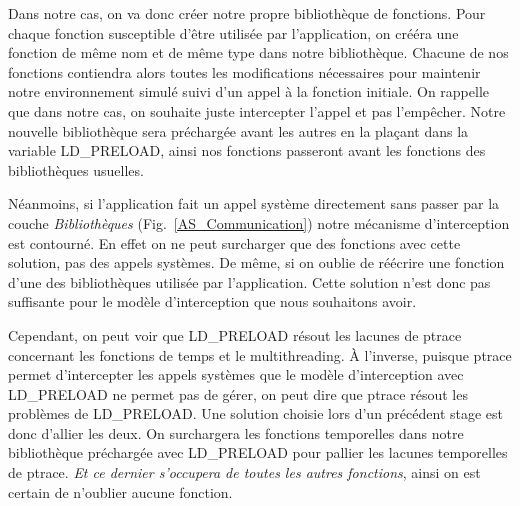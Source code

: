 Dans notre cas, on va donc créer notre propre bibliothèque de fonctions. Pour
chaque fonction susceptible d'être utilisée par l'application, on crééra une
fonction de même nom et de même type dans notre bibliothèque. Chacune de nos
fonctions contiendra alors toutes les modifications nécessaires pour maintenir
notre environnement simulé suivi d'un appel à la fonction initiale. On rappelle
que dans notre cas, on souhaite juste intercepter l'appel et pas l'empêcher.
Notre nouvelle bibliothèque sera préchargée avant les autres en la plaçant dans
la variable LD\_PRELOAD, ainsi nos fonctions passeront avant les fonctions des
bibliothèques usuelles.

Néanmoins, si l'application fait un appel système directement sans passer par la
couche \textit{Bibliothèques} (Fig.~\ref{AS_Communication}) notre mécanisme
d'interception est contourné. En effet on ne peut surcharger que des fonctions
avec cette solution, pas des appels systèmes. De même, si on oublie de réécrire
une fonction d'une des bibliothèques utilisée par l'application. Cette solution
n'est donc pas suffisante pour le modèle d'interception que nous souhaitons
avoir.

Cependant, on peut voir que LD\_PRELOAD résout les lacunes de ptrace concernant
les fonctions de temps et le multithreading. À l'inverse, puisque ptrace permet
d'intercepter les appels systèmes que le modèle d'interception avec LD\_PRELOAD
ne permet pas de gérer, on peut dire que ptrace résout les problèmes de
LD\_PRELOAD. Une solution choisie lors d'un précédent stage est donc d'allier
les deux. On surchargera les fonctions temporelles dans notre bibliothèque
préchargée avec LD\_PRELOAD pour pallier les lacunes temporelles de ptrace. \textit{Et ce dernier s'occupera de toutes les autres fonctions}, ainsi on est certain de
n'oublier aucune fonction.

